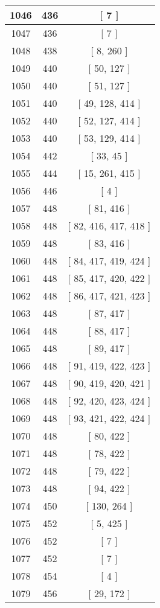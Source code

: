 \begin{center}
\begin{longtable}[H]{|| c c c ||}
\hline
1046 & 436 & [ 7 ] \\ 
\hline
1047 & 436 & [ 7 ] \\ 
\hline
1048 & 438 & [ 8, 260 ] \\ 
\hline
1049 & 440 & [ 50, 127 ] \\ 
\hline
1050 & 440 & [ 51, 127 ] \\ 
\hline
1051 & 440 & [ 49, 128, 414 ] \\ 
\hline
1052 & 440 & [ 52, 127, 414 ] \\ 
\hline
1053 & 440 & [ 53, 129, 414 ] \\ 
\hline
1054 & 442 & [ 33, 45 ] \\ 
\hline
1055 & 444 & [ 15, 261, 415 ] \\ 
\hline
1056 & 446 & [ 4 ] \\ 
\hline
1057 & 448 & [ 81, 416 ] \\ 
\hline
1058 & 448 & [ 82, 416, 417, 418 ] \\ 
\hline
1059 & 448 & [ 83, 416 ] \\ 
\hline
1060 & 448 & [ 84, 417, 419, 424 ] \\ 
\hline
1061 & 448 & [ 85, 417, 420, 422 ] \\ 
\hline
1062 & 448 & [ 86, 417, 421, 423 ] \\ 
\hline
1063 & 448 & [ 87, 417 ] \\ 
\hline
1064 & 448 & [ 88, 417 ] \\ 
\hline
1065 & 448 & [ 89, 417 ] \\ 
\hline
1066 & 448 & [ 91, 419, 422, 423 ] \\ 
\hline
1067 & 448 & [ 90, 419, 420, 421 ] \\ 
\hline
1068 & 448 & [ 92, 420, 423, 424 ] \\ 
\hline
1069 & 448 & [ 93, 421, 422, 424 ] \\ 
\hline
1070 & 448 & [ 80, 422 ] \\ 
\hline
1071 & 448 & [ 78, 422 ] \\ 
\hline
1072 & 448 & [ 79, 422 ] \\ 
\hline
1073 & 448 & [ 94, 422 ] \\ 
\hline
1074 & 450 & [ 130, 264 ] \\ 
\hline
1075 & 452 & [ 5, 425 ] \\ 
\hline
1076 & 452 & [ 7 ] \\ 
\hline
1077 & 452 & [ 7 ] \\ 
\hline
1078 & 454 & [ 4 ] \\ 
\hline
1079 & 456 & [ 29, 172 ] \\ 

\end{longtable}
\end{center}
